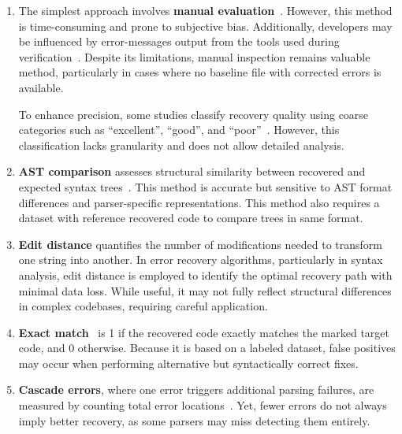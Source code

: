 \documentclass[conference]{IEEEtran}
\begin{document}
\begin{enumerate}
    \item The simplest approach involves \textbf{manual evaluation}~\cite{forward-move, natural_recovery}. However, this method is time-consuming and prone to subjective bias. Additionally, developers may be influenced by error-messages output from the tools used during verification~\cite{panic}. Despite its limitations, manual inspection remains valuable method, particularly in cases where no baseline file with corrected errors is available. 
    
    To enhance precision, some studies classify recovery quality using coarse categories such as ``excellent'', ``good'', and ``poor''~\cite{forward-move}. 
    However, this classification lacks granularity and does not allow detailed analysis.

    \item \textbf{AST comparison} assesses structural similarity between recovered and expected syntax trees~\cite{natural_recovery, fuzz_recovery}. This method is accurate but sensitive to AST format differences and parser-specific representations. This method also requires a dataset with reference recovered code to compare trees in same format.

    \item \textbf{Edit distance}\cite{editing-distance} quantifies the number of modifications needed to transform one string into another. In error recovery algorithms, particularly in syntax analysis, edit distance is employed to identify the optimal recovery path with minimal data loss\cite{panic}. While useful, it may not fully reflect structural differences in complex codebases, requiring careful application. 

    \item \textbf{Exact match}~\cite{exact-match-ai} is 1 if the recovered code exactly matches the marked target code, and 0 otherwise. Because it is based on a labeled dataset, false positives may occur when performing alternative but syntactically correct fixes. 
    

    \item \textbf{Cascade errors}, where one error triggers additional parsing failures, are measured by counting total error locations~\cite{panic}. Yet, fewer errors do not always imply better recovery, as some parsers may miss detecting them entirely.


\end{enumerate}
\end{document}
